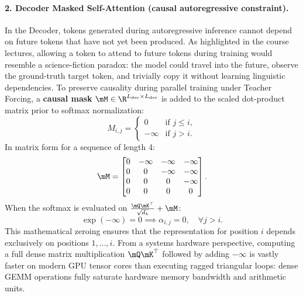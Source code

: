 \documentclass[../../main.tex]{subfiles}
\begin{document}
\paragraph{2. Decoder Masked Self-Attention (causal autoregressive constraint).}
In the Decoder, tokens generated during autoregressive inference cannot depend on future tokens that have not yet been produced.
As highlighted in the course lectures, allowing a token to attend to future tokens during training would resemble a science-fiction paradox: the model could travel into the future, observe the ground-truth target token, and trivially copy it without learning linguistic dependencies.
To preserve causality during parallel training under Teacher Forcing, a \textbf{causal mask} $\mM \in \R^{L_{\text{dec}} \times L_{\text{dec}}}$ is added to the scaled dot-product matrix prior to softmax normalization:
\begin{equation}
\label{eq:causal_mask_definition}
M_{i, j} = \begin{cases}
0 & \text{if } j \le i, \\
-\infty & \text{if } j > i.
\end{cases}
\end{equation}
In matrix form for a sequence of length 4:
\begin{equation}
\mM = \begin{bmatrix}
0 & -\infty & -\infty & -\infty \\
0 & 0 & -\infty & -\infty \\
0 & 0 & 0 & -\infty \\
0 & 0 & 0 & 0
\end{bmatrix}.
\end{equation}
When the softmax is evaluated on $\frac{\mQ \mK^\top}{\sqrt{d_k}} + \mM$:
\begin{equation}
\exp(-\infty) = 0 \implies \alpha_{i, j} = 0, \quad \forall j > i.
\end{equation}
This mathematical zeroing ensures that the representation for position $i$ depends exclusively on positions $1, \dots, i$.
From a systems hardware perspective, computing a full dense matrix multiplication $\mQ \mK^\top$ followed by adding $-\infty$ is vastly faster on modern GPU tensor cores than executing ragged triangular loops: dense GEMM operations fully saturate hardware memory bandwidth and arithmetic units.
\end{document}
